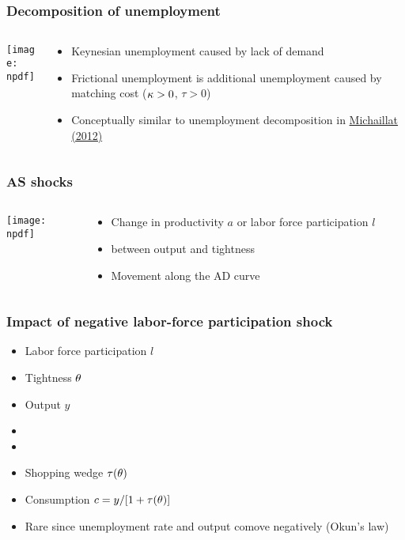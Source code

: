 \documentclass[11pt,aspectratio=169,xcolor={dvipsnames},hyperref={pdftex,pdfpagemode=UseNone,hidelinks,pdfdisplaydoctitle=true},usepdftitle=false]{beamer}
\newcommand{\npdf}{../figures/figures3.pdf}
\begin{document}
\begin{frame}
\frametitle{Decomposition of unemployment}
\begin{columns}
\begin{column}{0.6\textwidth}
\texttt{[image: \\npdf]}%
\end{column}
\begin{column}{0.4\textwidth}
\begin{itemize}
	\item Keynesian unemployment caused by lack of demand
	\item Frictional unemployment is additional unemployment caused by matching cost ($\kappa>0$, $\tau>0$)
	\item Conceptually similar to unemployment decomposition in \href{https://pascalmichaillat.org/1/}{Michaillat (2012)}
\end{itemize}
\end{column}
\end{columns} 
\end{frame}

\begin{frame}
\end{frame}

\begin{frame}
\frametitle{AS shocks}
\begin{columns}
\begin{column}{0.6\textwidth}
\texttt{[image: \\npdf]}%
\end{column}
\begin{column}{0.4\textwidth}
\begin{itemize}
	\item Change in productivity $a$ or labor force participation $l$
	\item {} between output and tightness
	\item Movement along the AD curve
\end{itemize}
\end{column}
\end{columns} 
\end{frame}

\begin{frame}
\frametitle{Impact of negative labor-force participation shock}
\begin{itemize}
\item Labor force participation $l$ \down
\item Tightness $\theta$ \up
\item Output $y$ \down
\item {}
\item {}
\item Shopping wedge $\tau(\theta)$ \up
\item Consumption $c = y/[1+\tau(\theta)]$ \down
\item Rare since unemployment rate and output comove negatively (Okun's law)
\end{itemize}	
\end{frame}
\end{document}
